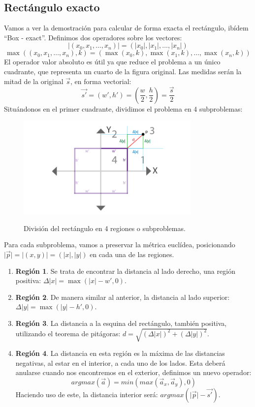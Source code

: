 \subsection{Rectángulo exacto}
Vamos a ver la demostración para calcular de forma exacta el rectángulo, ibídem \enquote{Box - exact}. Definimos dos operadores sobre los vectores:
\[\vert(x_0,x_1,\dots,x_n)\vert=(\vert x_0\vert,\vert x_1\vert,\dots,\vert x_n \vert)\]
\[\max\left((x_0,x_1,\dots,x_n), k\right)=(\max( x_0, k), \max(x_1, k),\dots, \max(x_n, k))\]
El operador valor absoluto es útil ya que reduce el problema a un único cuadrante, que representa un cuarto de la figura original. Las medidas serán la mitad de la original \(\Vec{s}\), en forma vectorial:
\[\Vec{s'}=(w', h')=\left(\dfrac{w}{2},\dfrac{h}{2}\right)=\dfrac{\Vec{s}}{2}\]
Situándonos en el primer cuadrante, dividimos el problema en 4 subproblemas:
\begin{figure}[H]
  \centering
  \captionsetup{justification=centering}%
  \includegraphics[width=0.8\textwidth]{secciones/imagenes/sdf/proofs/proof_rectangle.png}\label{fig:subproblem}
  \caption{División del rectángulo en 4 regiones o subproblemas.}
\end{figure}
Para cada subproblema, vamos a preservar la métrica euclídea, posicionando \(\vert\Vec{p}\vert=\vert(x,y)\vert=(\vert x\vert, \vert y \vert)\) en cada una de las regiones.
\begin{enumerate}
    \item \textbf{Región 1}. Se trata de encontrar la distancia al lado derecho, una región positiva: \(\Delta \vert x\vert=\max(\vert x\vert-w', 0)\).
    \item \textbf{Región 2}. De manera similar al anterior, la distancia al lado superior: \(\Delta\vert y\vert=\max(\vert y\vert-h', 0)\).
    \item \textbf{Región 3}. La distancia a la esquina del rectángulo, también positiva, utilizando el teorema de pitágoras: \(d = \sqrt{\left(\Delta \vert x\vert\right)^2+\left(\Delta \vert y\vert\right)^2}\).
    \item \textbf{Región 4}. La distancia en esta región es la máxima de las distancias negativas, al estar en el interior, a cada uno de los lados. Esta deberá anularse cuando nos encontremos en el exterior, definimos un nuevo operador:
    \[argmax(\Vec{a})=min(max(\Vec{a}_x, \Vec{a}_y), 0)\]
    Haciendo uso de este, la distancia interior será: \(argmax(\vert\Vec{p}\vert-\Vec{s'})\).
\end{enumerate}
